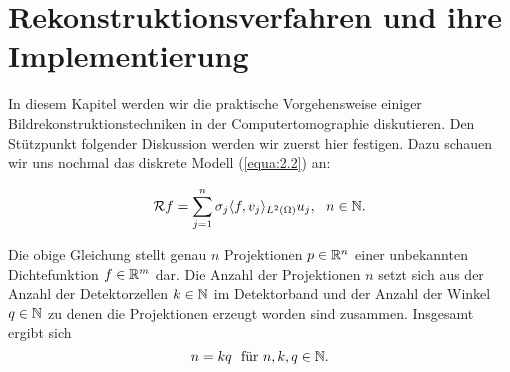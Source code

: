 \chapter*{Rekonstruktionsverfahren und ihre Implementierung}
\label{cha:3}

In diesem Kapitel werden wir die praktische Vorgehensweise einiger Bildrekonstruktionstechniken in der Computertomographie diskutieren. Den Stützpunkt folgender Diskussion werden wir zuerst hier festigen. Dazu schauen wir uns nochmal das diskrete Modell (\ref{equa:2.2}) an:

\[\mathcal{R}f = \sum\limits_{j = 1}^{n} \sigma_j \langle f, v_j\rangle_{L^2(\Omega)} u_j, \ \ n \in \mathbb{N}.\] 

Die obige Gleichung stellt genau $n$ Projektionen $p \in \mathbb{R}^n$ einer unbekannten Dichtefunktion $f \in \mathbb{R}^m$ dar. Die Anzahl der Projektionen $n$ setzt sich aus der Anzahl der Detektorzellen $k \in  \mathbb{N}$ im Detektorband und der Anzahl der Winkel $q \in \mathbb{N}$ zu denen die Projektionen erzeugt worden sind zusammen. Insgesamt ergibt sich
\begin{equation}
	n = kq \ \ \mbox{für} \ n,k,q \in \mathbb{N}.
	\label{equa:3.1}
\end{equation}
